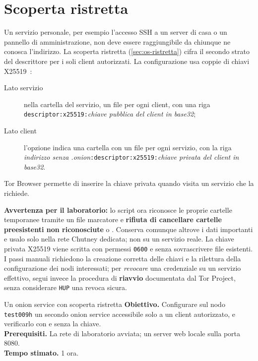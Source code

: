 \section{Scoperta ristretta}\label{sec:onionp-ristretta}

Un servizio personale, per esempio l'accesso SSH a un server di casa o un pannello di amministrazione, non deve essere raggiungibile da chiunque ne conosca l'indirizzo. La scoperta ristretta (\cref{sec:os-ristretta}) cifra il secondo strato del descrittore per i soli client autorizzati. La configurazione usa coppie di chiavi X25519~\cite{torspec}:
\begin{description}
  \item[Lato servizio] nella cartella  del servizio, un file  per ogni client, con una riga
  \texttt{descriptor:\allowbreak x25519:}\emph{chiave pubblica del client in base32};
  \item[Lato client] l'opzione  indica una cartella con un file  per ogni servizio, con la riga
  \emph{indirizzo senza .onion}\texttt{:\allowbreak descriptor:\allowbreak x25519:}\emph{chiave privata del client in base32}.
\end{description}
Tor Browser permette di inserire la chiave privata quando visita un servizio che la richiede.

\textbf{Avvertenza per il laboratorio:} lo script
 ora riconosce
le proprie cartelle temporanee tramite un file marcatore e
\textbf{rifiuta di cancellare cartelle preesistenti non riconosciute}
 o . Conserva comunque
altrove i dati importanti e usalo solo nella rete Chutney
dedicata; non su un servizio reale. La chiave privata X25519 viene
scritta con permessi \texttt{0600} e senza sovrascrivere file
esistenti. I passi manuali richiedono la creazione corretta delle
chiavi e la rilettura della configurazione dei nodi interessati;
per \emph{revocare} una credenziale su un servizio effettivo,
segui invece la procedura di \textbf{riavvio} documentata dal
Tor Project, senza considerare \texttt{HUP} una revoca sicura.

\begin{laboratorio}[13]{Un onion service con scoperta ristretta}
\textbf{Obiettivo.} Configurare sul nodo \texttt{test009h} un secondo onion service accessibile solo a un client autorizzato, e verificarlo con e senza la chiave.\\
\textbf{Prerequisiti.} La rete di laboratorio avviata; un server web locale sulla porta 8080.\\
\textbf{Tempo stimato.} 1 ora.
\end{laboratorio}

